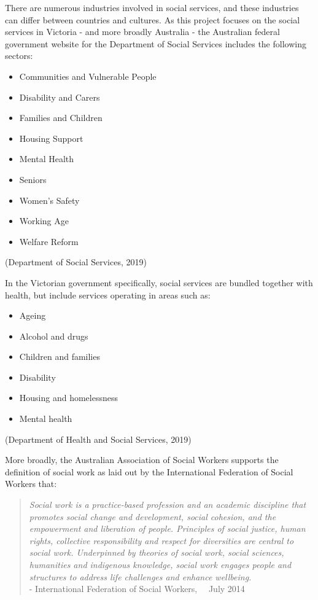 \documentclass[
  11pt,
]{article}
\providecommand{\tightlist}{%
  \setlength{\itemsep}{0pt}\setlength{\parskip}{0pt}}
\begin{document}
There are numerous industries involved in social services, and these industries can differ between countries and cultures. As this project focuses on the social services in Victoria - and more broadly Australia - the Australian federal government website for the Department of Social Services includes the following sectors:

\begin{itemize}
\tightlist
\item
  Communities and Vulnerable People
\item
  Disability and Carers
\item
  Families and Children
\item
  Housing Support
\item
  Mental Health
\item
  Seniors
\item
  Women's Safety
\item
  Working Age
\item
  Welfare Reform
\end{itemize}

(Department of Social Services, 2019)

In the Victorian government specifically, social services are bundled together with health, but include services operating in areas such as:

\begin{itemize}
\tightlist
\item
  Ageing
\item
  Alcohol and drugs
\item
  Children and families
\item
  Disability
\item
  Housing and homelessness
\item
  Mental health
\end{itemize}

(Department of Health and Social Services, 2019)

\newpage

More broadly, the Australian Association of Social Workers supports the definition of social work as laid out by the International Federation of Social Workers that:

\begin{quote}
\emph{Social work is a practice-based profession and an academic discipline that promotes social change and development, social cohesion, and the empowerment and liberation of people. Principles of social justice, human rights, collective responsibility and respect for diversities are central to social work. Underpinned by theories of social work, social sciences, humanities and indigenous knowledge, social work engages people and structures to address life challenges and enhance wellbeing.}\\
\quad - International Federation of Social Workers, \newline \quad \quad ~~July 2014
\end{quote}
\end{document}
